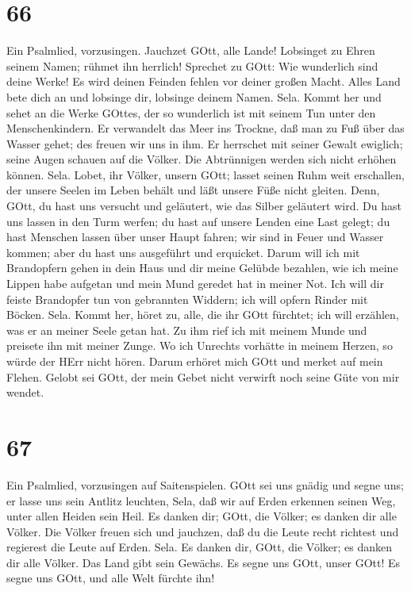 \hypertarget{section-65}{%
\section{66}\label{section-65}}

 Ein Psalmlied, vorzusingen. Jauchzet GOtt, alle Lande!
 Lobsinget zu Ehren seinem Namen; rühmet ihn herrlich!
 Sprechet zu GOtt: Wie wunderlich sind deine Werke! Es wird
deinen Feinden fehlen vor deiner großen Macht.  Alles Land
bete dich an und lobsinge dir, lobsinge deinem Namen. Sela. 
Kommt her und sehet an die Werke GOttes, der so wunderlich ist mit
seinem Tun unter den Menschenkindern.  Er verwandelt das
Meer ins Trockne, daß man zu Fuß über das Wasser gehet; des freuen wir
uns in ihm.  Er herrschet mit seiner Gewalt ewiglich; seine
Augen schauen auf die Völker. Die Abtrünnigen werden sich nicht erhöhen
können. Sela.  Lobet, ihr Völker, unsern GOtt; lasset seinen
Ruhm weit erschallen,  der unsere Seelen im Leben behält und
läßt unsere Füße nicht gleiten.  Denn, GOtt, du hast uns
versucht und geläutert, wie das Silber geläutert wird.  Du
hast uns lassen in den Turm werfen; du hast auf unsere Lenden eine Last
gelegt;  du hast Menschen lassen über unser Haupt fahren;
wir sind in Feuer und Wasser kommen; aber du hast uns ausgeführt und
erquicket.  Darum will ich mit Brandopfern gehen in dein
Haus und dir meine Gelübde bezahlen,  wie ich meine Lippen
habe aufgetan und mein Mund geredet hat in meiner Not.  Ich
will dir feiste Brandopfer tun von gebrannten Widdern; ich will opfern
Rinder mit Böcken. Sela.  Kommt her, höret zu, alle, die
ihr GOtt fürchtet; ich will erzählen, was er an meiner Seele getan hat.
 Zu ihm rief ich mit meinem Munde und preisete ihn mit
meiner Zunge.  Wo ich Unrechts vorhätte in meinem Herzen,
so würde der HErr nicht hören.  Darum erhöret mich GOtt und
merket auf mein Flehen.  Gelobt sei GOtt, der mein Gebet
nicht verwirft noch seine Güte von mir wendet.

\hypertarget{section-66}{%
\section{67}\label{section-66}}

 Ein Psalmlied, vorzusingen auf Saitenspielen. 
GOtt sei uns gnädig und segne uns; er lasse uns sein Antlitz leuchten,
Sela,  daß wir auf Erden erkennen seinen Weg, unter allen
Heiden sein Heil.  Es danken dir; GOtt, die Völker; es
danken dir alle Völker.  Die Völker freuen sich und
jauchzen, daß du die Leute recht richtest und regierest die Leute auf
Erden. Sela.  Es danken dir, GOtt, die Völker; es danken dir
alle Völker.  Das Land gibt sein Gewächs. Es segne uns GOtt,
unser GOtt!  Es segne uns GOtt, und alle Welt fürchte ihn!

